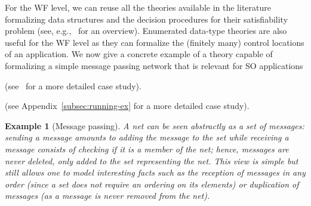 \documentclass[conference]{IEEEtran}
\newtheorem{example}{Example}
\begin{document}
For the WF level, we can reuse all the theories available in the
literature formalizing data structures and the decision procedures for
their satisfiability problem (see, e.g.,~\cite{sebastiani} for an
overview).  Enumerated data-type theories are also useful for the WF
level as they can formalize the (finitely many) control locations of
an application.  We now give a concrete example of a theory capable of
formalizing a simple message passing network that is relevant for SO
applications 
\begin{SHORT}
(see~\cite{BRV-TR09} for a more detailed case study).
\end{SHORT} 
\begin{LONG}
(see Appendix~\ref{subsec:running-ex} for a more detailed case study).
\end{LONG}
\begin{example}[Message passing]
  \label{ex:msg-pass}
  A net can be seen abstractly as a set of messages: sending a message
  amounts to adding the message to the set while receiving a message
  consists of checking if it is a member of the net; hence, messages
  are never deleted, only added to the set representing the net.  This
  view is simple but still allows one to model interesting facts such
  as the reception of messages in any order (since a set does not
  require an ordering on its elements) or duplication of messages (as
  a message is never removed from the net).


\end{example}
\end{document}
